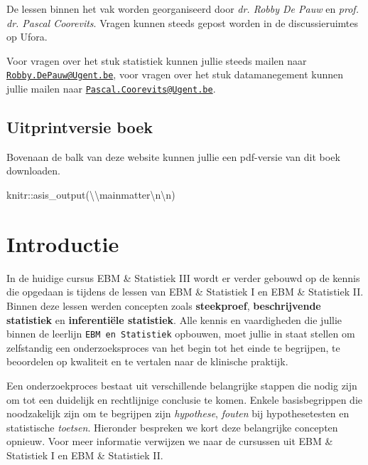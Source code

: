 \documentclass[
]{book}
\newenvironment{Shaded}{\begin{snugshade}}{\end{snugshade}}
\newcommand{\FunctionTok}[1]{\textcolor[rgb]{0.00,0.00,0.00}{#1}}
\newcommand{\NormalTok}[1]{#1}
\newcommand{\SpecialCharTok}[1]{\textcolor[rgb]{0.00,0.00,0.00}{#1}}
\newcommand{\StringTok}[1]{\textcolor[rgb]{0.31,0.60,0.02}{#1}}
\theoremstyle{definition}
\theoremstyle{definition}
\theoremstyle{definition}
\theoremstyle{definition}
\theoremstyle{remark}
\begin{document}
De lessen binnen het vak worden georganiseerd door \emph{dr. Robby De Pauw} en \emph{prof. dr. Pascal Coorevits}. Vragen kunnen steeds gepost worden in de discussieruimtes op Ufora.

Voor vragen over het stuk statistiek kunnen jullie steeds mailen naar \href{mailto:Robby.DePauw@Ugent.be}{\nolinkurl{Robby.DePauw@Ugent.be}}, voor vragen over het stuk datamanegement kunnen jullie mailen naar \href{mailto:Pascal.Coorevits@Ugent.be}{\nolinkurl{Pascal.Coorevits@Ugent.be}}.

\hypertarget{uitprintversie-boek}{%
\section*{Uitprintversie boek}\label{uitprintversie-boek}}


Bovenaan de balk van deze website kunnen jullie een pdf-versie van dit boek downloaden.

\begin{Shaded}
\begin{Highlighting}[]
\NormalTok{knitr}\SpecialCharTok{::}\FunctionTok{asis\_output}\NormalTok{(}\StringTok{\textquotesingle{}}\SpecialCharTok{\textbackslash{}\textbackslash{}}\StringTok{mainmatter}\SpecialCharTok{\textbackslash{}n\textbackslash{}n}\StringTok{\textquotesingle{}}\NormalTok{)}
\end{Highlighting}
\end{Shaded}

\mainmatter

\hypertarget{intro}{%
\chapter{Introductie}\label{intro}}

In de huidige cursus {EBM \& Statistiek III} wordt er verder gebouwd op de kennis die opgedaan is tijdens de lessen van {EBM \& Statistiek I} en {EBM \& Statistiek II}. Binnen deze lessen werden concepten zoals \textbf{steekproef}, \textbf{beschrijvende statistiek} en \textbf{inferentiële statistiek}. Alle kennis en vaardigheden die jullie binnen de leerlijn \texttt{EBM\ en\ Statistiek} opbouwen, moet jullie in staat stellen om zelfstandig een onderzoeksproces van het begin tot het einde te begrijpen, te beoordelen op kwaliteit en te vertalen naar de klinische praktijk.

Een onderzoekproces bestaat uit verschillende belangrijke stappen die nodig zijn om tot een duidelijk en rechtlijnige conclusie te komen. Enkele basisbegrippen die noodzakelijk zijn om te begrijpen zijn \emph{hypothese}, \emph{fouten} bij hypothesetesten en statistische \emph{toetsen}. Hieronder bespreken we kort deze belangrijke concepten opnieuw. Voor meer informatie verwijzen we naar de cursussen uit {EBM \& Statistiek I} en {EBM \& Statistiek II}.
\end{document}
